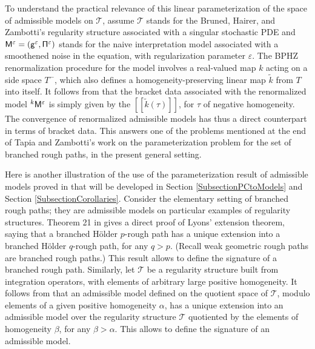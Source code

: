 \documentclass[JEP,XML,SOM,Unicode,published]{cedram}
\theoremstyle{plain}
\theoremstyle{definition}
\newcommand{\Brac}[1]{[\![#1]\!]}
\let\epsilon\varepsilon
\begin{document}
To understand the practical relevance of this linear parameterization of the space of admissible models on $\mathscr{T}$, assume $\mathscr{T}$ stands for the Bruned, Hairer, and Zambotti's regularity structure \cite{BHZ} associated with a singular stochastic PDE and ${\sf M}^\epsilon = ({\sf g}^\epsilon,{\sf \Pi}^\epsilon)$ stands for the naive interpretation model associated with a smoothened noise in the equation, with regularization parameter $\epsilon$. The BPHZ renormalization procedure for the model involves a real-valued map $k$ acting on a side space $T^-$, which also defines a homogeneity-preserving linear map $\widetilde{k}$ from $T$ into itself. It follows from \cite[Th.\,21]{BH} that the bracket data associated with the renormalized model $^k{{\sf M}^\epsilon}$ is simply given by the $\Brac{\widetilde{k}(\tau)}$, for $\tau$ of negative homogeneity. The convergence of renormalized admissible models has thus a direct counterpart in terms of bracket data. This answers one of the problems mentioned at the end of Tapia and Zambotti's work \cite{TZ18} on the parameterization problem for the set of branched rough paths, in the present general setting.

Here is another illustration of the use of the parameterization result of admissible models proved in \cite{BH} that will be developed in Section \ref{SubsectionPCtoModels} and Section \ref{SubsectionCorollaries}. Consider the elementary setting of branched rough paths; they are admissible models on particular examples of regularity structures. Theorem 21 in \cite{BH} gives a direct proof of Lyons' extension theorem, saying that a branched Hölder $p$-rough path has a unique extension into a branched Hölder $q$-rough path, for any $q>p$. (Recall weak geometric rough paths are branched rough paths.) This result allows to define the signature of a branched rough path. Similarly, let $\mathscr{T}$ be a regularity structure built from integration operators, with elements of arbitrary large positive homogeneity. It follows from \hbox{\cite[Th.\,21]{BH}} that an admissible model defined on the quotient space of $\mathscr{T}$, modulo elements of a given positive homogeneity $\alpha$, has a unique extension into an admissible model over the regularity structure $\mathscr{T}$ quotiented by the elements of homogeneity $\beta$, for any $\beta>\alpha$. This allows to define the signature of an admissible model.
\end{document}
